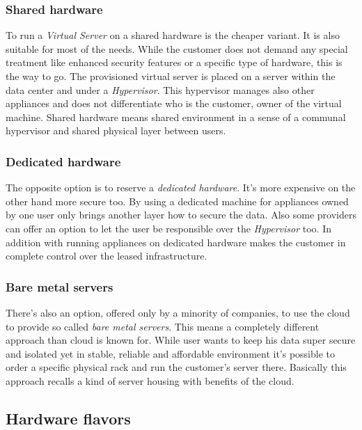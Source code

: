 \subsubsection{Shared hardware}
\label{subs:Shared hardware}

To run a \emph{Virtual Server} on a shared hardware is the cheaper variant. It is also suitable for most of the needs. While the customer does not demand any special treatment like enhanced security features or a specific type of hardware, this is the way to go. The provisioned virtual server is placed on a server within the data center and under a \emph{Hypervisor}. This hypervisor manages also other appliances and does not differentiate who is the customer, owner of the virtual machine. Shared hardware means shared environment in a sense of a communal hypervisor and shared physical layer between users.

\subsubsection{Dedicated hardware}
\label{subs:Dedicated hardware}

The opposite option is to reserve a \emph{dedicated hardware}. It's more expensive on the other hand more secure too. By using a dedicated machine for appliances owned by one user only brings another layer how to secure the data. Also some providers can offer an option to let the user be responsible over the \emph{Hypervisor} too. In addition with running appliances on dedicated hardware makes the customer in complete control over the leased infrastructure.

\subsubsection{Bare metal servers}
\label{subs:Bare metal servers}

There's also an option, offered only by a minority of companies, to use the cloud to provide so called \emph{bare metal servers}. This means a completely different approach than cloud is known for. While user wants to keep his data super secure and isolated yet in stable, reliable and affordable environment it's possible to order a specific physical rack and run the customer's server there. Basically this approach recalls a kind of server housing with benefits of the cloud.

\subsection{Hardware flavors}
\label{sub:Hardware flavors}

